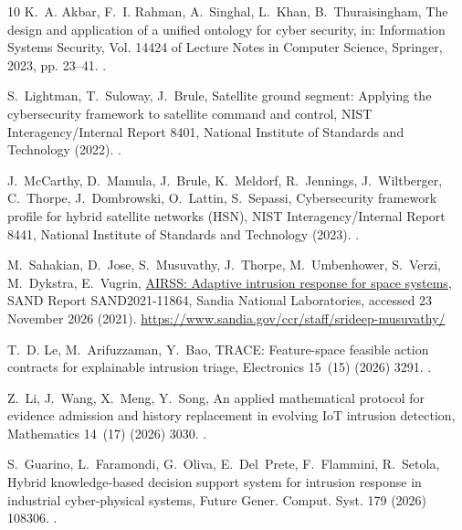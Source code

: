\documentclass[preprint,12pt]{elsarticle}
\begin{document}
\begin{thebibliography}{10}
K.~A. Akbar, F.~I. Rahman, A.~Singhal, L.~Khan, B.~Thuraisingham, The design
  and application of a unified ontology for cyber security, in: Information
  Systems Security, Vol. 14424 of Lecture Notes in Computer Science, Springer,
  2023, pp. 23--41.
\newblock \href {https://doi.org/10.1007/978-3-031-49099-6{\_}2}
  {}.

S.~Lightman, T.~Suloway, J.~Brule, Satellite ground segment: Applying the
  cybersecurity framework to satellite command and control, NIST
  Interagency/Internal Report 8401, National Institute of Standards and
  Technology (2022).
\newblock \href {https://doi.org/10.6028/NIST.IR.8401}
  {}.

J.~McCarthy, D.~Mamula, J.~Brule, K.~Meldorf, R.~Jennings, J.~Wiltberger,
  C.~Thorpe, J.~Dombrowski, O.~Lattin, S.~Sepassi, Cybersecurity framework
  profile for hybrid satellite networks ({HSN}), NIST Interagency/Internal
  Report 8441, National Institute of Standards and Technology (2023).
\newblock \href {https://doi.org/10.6028/NIST.IR.8441}
  {}.

M.~Sahakian, D.~Jose, S.~Musuvathy, J.~Thorpe, M.~Umbenhower, S.~Verzi,
  M.~Dykstra, E.~Vugrin,
  \href{https://www.sandia.gov/ccr/staff/srideep-musuvathy/}{{AIRSS}: Adaptive
  intrusion response for space systems}, SAND Report SAND2021-11864, Sandia
  National Laboratories, accessed 23 November 2026 (2021).
\newline\urlprefix\url{https://www.sandia.gov/ccr/staff/srideep-musuvathy/}

T.~D. Le, M.~Arifuzzaman, Y.~Bao, {TRACE}: Feature-space feasible action
  contracts for explainable intrusion triage, Electronics 15~(15) (2026) 3291.
\newblock \href {https://doi.org/10.3390/electronics15153291}
  {}.

Z.~Li, J.~Wang, X.~Meng, Y.~Song, An applied mathematical protocol for evidence
  admission and history replacement in evolving {IoT} intrusion detection,
  Mathematics 14~(17) (2026) 3030.
\newblock \href {https://doi.org/10.3390/math14173030}
  {}.

S.~Guarino, L.~Faramondi, G.~Oliva, E.~Del~Prete, F.~Flammini, R.~Setola,
  Hybrid knowledge-based decision support system for intrusion response in
  industrial cyber-physical systems, Future Gener. Comput. Syst. 179 (2026)
  108306.
\newblock \href {https://doi.org/10.1016/j.future.2025.108306}
  {}.


\end{thebibliography}
\end{document}
